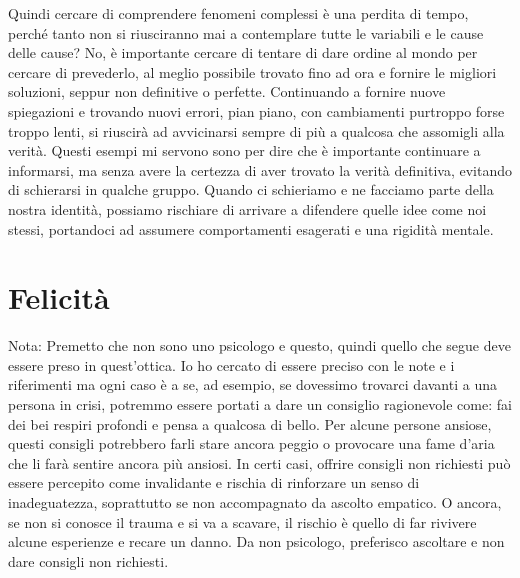 \documentclass[12pt]{book} %
\begin{document}
\begin{mdframed}[linewidth=1pt]
Quindi cercare di comprendere fenomeni complessi è una perdita di tempo, perché tanto non si riusciranno mai a contemplare tutte le variabili e le cause delle cause? No, è importante cercare di tentare di dare ordine al mondo per cercare di prevederlo, al meglio possibile trovato fino ad ora e fornire le migliori soluzioni, seppur non definitive o perfette.
Continuando a fornire nuove spiegazioni e trovando nuovi errori, pian piano, con cambiamenti purtroppo forse troppo lenti, si riuscirà ad avvicinarsi sempre di più a qualcosa che assomigli alla verità.
Questi esempi mi servono sono per dire che è importante continuare a informarsi, ma senza avere la certezza di aver trovato la verità definitiva, evitando di schierarsi in qualche gruppo. Quando ci schieriamo e ne facciamo parte della nostra identità, possiamo rischiare di arrivare a difendere quelle idee come noi stessi, portandoci ad assumere comportamenti esagerati e una rigidità mentale.
\end{mdframed}

\clearpage\section{Felicità}
\begin{mdframed}[linewidth=1pt]
Nota: Premetto che non sono uno psicologo e questo, quindi quello che segue deve essere preso in
quest'ottica. Io ho cercato di essere preciso con le note e i riferimenti ma ogni caso è a se, ad
esempio, se dovessimo trovarci davanti a una persona in crisi, potremmo essere portati a dare un consiglio ragionevole
come: fai dei bei respiri profondi e pensa a qualcosa di bello. Per alcune persone ansiose, questi consigli potrebbero
farli stare ancora peggio o provocare una fame d'aria che li farà sentire ancora più ansiosi.
In certi casi, offrire consigli non richiesti può essere percepito come invalidante e rischia di rinforzare un senso di inadeguatezza, soprattutto se non accompagnato da ascolto empatico. O ancora, se non si conosce il trauma e si va a scavare, il rischio è quello di far rivivere alcune esperienze e recare
un danno. Da non psicologo, preferisco ascoltare e non dare consigli non richiesti.
\end{mdframed}
\end{document}
